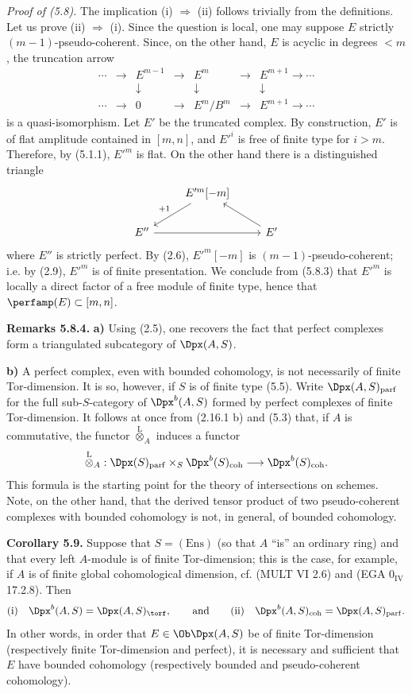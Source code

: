 \emph{Proof of (5.8).} The implication (i) \(\Rightarrow\) (ii) follows trivially from the definitions. Let us prove (ii) \(\Rightarrow\) (i). Since the question is local, one may suppose \(E\) strictly \((m-1)\)-pseudo-coherent. Since, on the other hand, \(E\) is acyclic in degrees \(<m\), the truncation arrow
\[
\begin{array}{ccccccc}
\cdots&\to&E^{m-1}&\to&E^m&\to&E^{m+1}\to\cdots\\
&&\downarrow&&\downarrow&&\downarrow\\
\cdots&\to&0&\to&E^m/B^m&\to&E^{m+1}\to\cdots
\end{array}
\]
is a quasi-isomorphism. Let \(E'\) be the truncated complex. By construction, \(E'\) is of flat amplitude contained in \([m,n]\), and \(E'^i\) is free of finite type for \(i>m\). Therefore, by (5.1.1), \(E'^m\) is flat. On the other hand there is a distinguished triangle
\[
\begin{tikzcd}
& E'^m[-m] \arrow[dl,"+1"'] & \\
E'' \arrow[rr] && E' \arrow[ul]
\end{tikzcd}
\]
where \(E''\) is strictly perfect. By (2.6), \(E'^m[-m]\) is \((m-1)\)-pseudo-coherent; i.e. by (2.9), \(E'^m\) is of finite presentation. We conclude from (5.8.3) that \(E'^m\) is locally a direct factor of a free module of finite type, hence that \(\perfamp(E)\subset[m,n]\).

\textbf{Remarks 5.8.4.} \textbf{a)} Using (2.5), one recovers the fact that perfect complexes form a triangulated subcategory of \(\Dpx(A,S)\).

\textbf{b)} A perfect complex, even with bounded cohomology, is not necessarily of finite Tor-dimension. It is so, however, if \(S\) is of finite type (5.5). Write \(\Dpx(A,S)_{\mathrm{parf}}\) for the full sub-\(S\)-category of \(\Dpx^b(A,S)\) formed by perfect complexes of finite Tor-dimension. It follows at once from (2.16.1 b) and (5.3) that, if \(A\) is commutative, the functor \(\overset{\mathrm L}{\otimes}_A\) induces a functor
\[
  \overset{\mathrm L}{\otimes}_A:
  \Dpx(S)_{\mathrm{parf}}\times_S \Dpx^b(S)_{\mathrm{coh}}
  \longrightarrow \Dpx^b(S)_{\mathrm{coh}}.
\]
This formula is the starting point for the theory of intersections on schemes. Note, on the other hand, that the derived tensor product of two pseudo-coherent complexes with bounded cohomology is not, in general, of bounded cohomology.

\textbf{Corollary 5.9.} Suppose that \(S=(\mathrm{Ens})\) (so that \(A\) ``is'' an ordinary ring) and that every left \(A\)-module is of finite Tor-dimension; this is the case, for example, if \(A\) is of finite global cohomological dimension, cf. (MULT VI 2.6) and (EGA \(0_{\mathrm{IV}}\) 17.2.8). Then
\[
\text{(i)}\quad \Dpx^b(A,S)=\Dpx(A,S)_{\torf},
\qquad
\text{and}
\qquad
\text{(ii)}\quad \Dpx^b(A,S)_{\mathrm{coh}}=\Dpx(A,S)_{\mathrm{parf}}.
\]
In other words, in order that \(E\in\Ob\Dpx(A,S)\) be of finite Tor-dimension (respectively finite Tor-dimension and perfect), it is necessary and sufficient that \(E\) have bounded cohomology (respectively bounded and pseudo-coherent cohomology).

